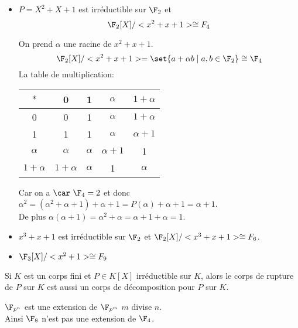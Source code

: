 \begin{exemple}

	\begin{itemize}
		\item $P = X^2+X+1$ est irréductible sur $\F_2$ et
		      $$\F_2[X]/ <x^2+x+1> \cong F_4$$

		      On prend $\alpha$ une racine de $x^2+x+1$.
		      $$\F_2[X]/ <x^2+x+1> = \set{ a + \alpha b \mid a,b \in \F_2} \cong \F_4$$
		      La table de multiplication:

		      \begin{center}
			      \begin{tabular}{c|c|c|c|c}
				      $*$        & 0          & 1        & $\alpha$    & $1+\alpha$  \\
				      \hline
				      0          & 0          & 1        & $\alpha$    & $1+\alpha$  \\
				      \hline
				      1          & 1          & 1        & $\alpha$    & $\alpha +1$ \\
				      \hline
				      $\alpha$   & $\alpha$   & $\alpha$ & $\alpha +1$ & 1           \\
				      \hline
				      $1+\alpha$ & $1+\alpha$ & $\alpha$ & 1           & $\alpha$    \\
			      \end{tabular}
		      \end{center}

		      Car on a $\car \ \F_4 = 2$ et donc $\alpha^2 = (\alpha^2 + \alpha + 1 ) + \alpha + 1 =  P(\alpha) + \alpha + 1 = \alpha + 1$. \\
		      De plus $\alpha(\alpha + 1) = \alpha^2 + \alpha = \alpha + 1 + \alpha = 1$.
		\item$x^3+x+1$ est irréductible sur $\F_2$ et $\F_2[X]/ <x^3+x+1> \cong F_6$.
		\item$ \F_3[X]/ <x^2+1> \cong F_9$
	\end{itemize}
\end{exemple}


\begin{exercice}
	Si $K$ est un corps fini et $P \in K[X]$ irréductible sur $K$, alors le
	corps de rupture de $P$ sur $K$ est aussi un corps de décomposition pour $P$ sur $K$.
\end{exercice}

\begin{remarque}
	$\F_{p^n}$ est une extension de $\F_{p^m}$ \ssi $m$ divise $n$.\\
	Ainsi $\F_8$ n'est pas une extension de $\F_4$. \\
\end{remarque}

